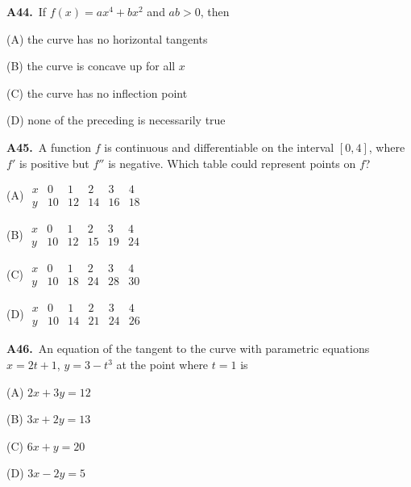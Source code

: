 \documentclass[11pt]{article}
\begin{document}
\bigskip\noindent\textbf{A44.}\ If $f(x) = ax^4+bx^2$ and $ab>0$, then
\begin{list}{}{\setlength{\leftmargin}{3em}\setlength{\labelwidth}{2.5em}\setlength{\itemsep}{0pt}\setlength{\topsep}{2pt}}
\item[(A)] the curve has no horizontal tangents
\item[(B)] the curve is concave up for all $x$
\item[(C)] the curve has no inflection point
\item[(D)] none of the preceding is necessarily true
\end{list}

\bigskip\noindent\textbf{A45.}\ A function $f$ is continuous and differentiable on the interval $[0,4]$, where $f'$ is positive but $f''$ is negative. Which table could represent points on $f$?
\begin{list}{}{\setlength{\leftmargin}{3em}\setlength{\labelwidth}{2.5em}\setlength{\itemsep}{0pt}\setlength{\topsep}{2pt}}
\item[(A)] $\begin{array}{c|rrrrr}x&0&1&2&3&4\\y&10&12&14&16&18\end{array}$
\item[(B)] $\begin{array}{c|rrrrr}x&0&1&2&3&4\\y&10&12&15&19&24\end{array}$
\item[(C)] $\begin{array}{c|rrrrr}x&0&1&2&3&4\\y&10&18&24&28&30\end{array}$
\item[(D)] $\begin{array}{c|rrrrr}x&0&1&2&3&4\\y&10&14&21&24&26\end{array}$
\end{list}

\bigskip\noindent\textbf{A46.}\ An equation of the tangent to the curve with parametric equations $x = 2t+1$, $y = 3-t^3$ at the point where $t=1$ is
\begin{list}{}{\setlength{\leftmargin}{3em}\setlength{\labelwidth}{2.5em}\setlength{\itemsep}{0pt}\setlength{\topsep}{2pt}}
\item[(A)] $2x+3y=12$
\item[(B)] $3x+2y=13$
\item[(C)] $6x+y=20$
\item[(D)] $3x-2y=5$
\end{list}
\end{document}
